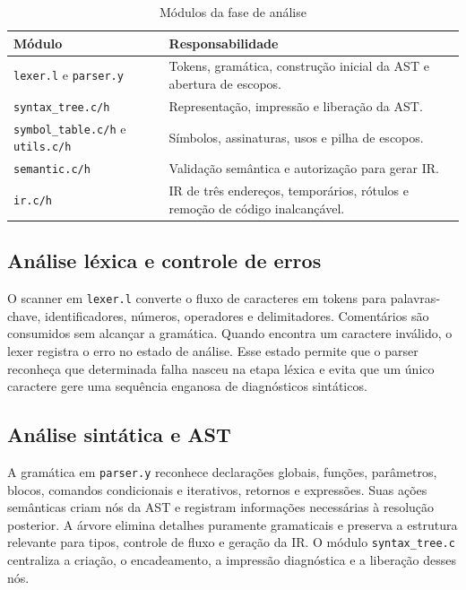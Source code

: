 \documentclass[
  12pt,
  oneside,
  a4paper,
  english,
  french,
  spanish,
  brazilian,
]{abntex2}
\begin{document}
\begin{table}[H]
\centering
\ABNTEXfontereduzida
\caption{Módulos da fase de análise}
\label{tab:frontend}
\begin{tabular}{|p{}|p{}|}
\hline
\textbf{Módulo} & \textbf{Responsabilidade} \\
\hline
\texttt{lexer.l} e \texttt{parser.y} & Tokens, gramática, construção inicial da AST e abertura de escopos. \\
\hline
\texttt{syntax\_tree.c/h} & Representação, impressão e liberação da AST. \\
\hline
\texttt{symbol\_table.c/h} e \texttt{utils.c/h} & Símbolos, assinaturas, usos e pilha de escopos. \\
\hline
\texttt{semantic.c/h} & Validação semântica e autorização para gerar IR. \\
\hline
\texttt{ir.c/h} & IR de três endereços, temporários, rótulos e remoção de código inalcançável. \\
\hline
\end{tabular}
\end{table}

\subsection{Análise léxica e controle de erros}

O scanner em \texttt{lexer.l} converte o fluxo de caracteres em tokens para palavras-chave, identificadores, números, operadores e delimitadores. Comentários são consumidos sem alcançar a gramática. Quando encontra um caractere inválido, o lexer registra o erro no estado de análise. Esse estado permite que o parser reconheça que determinada falha nasceu na etapa léxica e evita que um único caractere gere uma sequência enganosa de diagnósticos sintáticos.

\subsection{Análise sintática e AST}

A gramática em \texttt{parser.y} reconhece declarações globais, funções, parâmetros, blocos, comandos condicionais e iterativos, retornos e expressões. Suas ações semânticas criam nós da AST e registram informações necessárias à resolução posterior. A árvore elimina detalhes puramente gramaticais e preserva a estrutura relevante para tipos, controle de fluxo e geração da IR. O módulo \texttt{syntax\_tree.c} centraliza a criação, o encadeamento, a impressão diagnóstica e a liberação desses nós.
\end{document}
